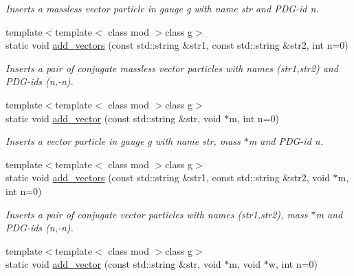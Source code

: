 \begin{DoxyCompactItemize}
\begin{DoxyCompactList}\small\item\em Inserts a massless vector particle in gauge g with name str and P\-D\-G-\/id n. \end{DoxyCompactList}\item 
\hypertarget{a00370_ad582726dbded0bc66c8f8bda99446b7d}{{\footnotesize template$<$template$<$ class mod $>$class g$>$ }\\static void \hyperlink{a00370_ad582726dbded0bc66c8f8bda99446b7d}{add\-\_\-vectors} (const std\-::string \&str1, const std\-::string \&str2, int n=0)}\label{a00370_ad582726dbded0bc66c8f8bda99446b7d}

\begin{DoxyCompactList}\small\item\em Inserts a pair of conjugate massless vector particles with names (str1,str2) and P\-D\-G-\/ids (n,-\/n). \end{DoxyCompactList}\item 
\hypertarget{a00370_ab03c093b9bd2cf4d67f646204bf2f7d0}{{\footnotesize template$<$template$<$ class mod $>$class g$>$ }\\static void \hyperlink{a00370_ab03c093b9bd2cf4d67f646204bf2f7d0}{add\-\_\-vector} (const std\-::string \&str, void $\ast$m, int n=0)}\label{a00370_ab03c093b9bd2cf4d67f646204bf2f7d0}

\begin{DoxyCompactList}\small\item\em Inserts a vector particle in gauge g with name str, mass $\ast$m and P\-D\-G-\/id n. \end{DoxyCompactList}\item 
\hypertarget{a00370_ab97bc2dcf6fa9351a4d615be5e7a8425}{{\footnotesize template$<$template$<$ class mod $>$class g$>$ }\\static void \hyperlink{a00370_ab97bc2dcf6fa9351a4d615be5e7a8425}{add\-\_\-vectors} (const std\-::string \&str1, const std\-::string \&str2, void $\ast$m, int n=0)}\label{a00370_ab97bc2dcf6fa9351a4d615be5e7a8425}

\begin{DoxyCompactList}\small\item\em Inserts a pair of conjugate vector particles with names (str1,str2), mass $\ast$m and P\-D\-G-\/ids (n,-\/n). \end{DoxyCompactList}\item 
\hypertarget{a00370_a8fb7f8b4ddb45dc1889b046a0f333a3b}{{\footnotesize template$<$template$<$ class mod $>$class g$>$ }\\static void \hyperlink{a00370_a8fb7f8b4ddb45dc1889b046a0f333a3b}{add\-\_\-vector} (const std\-::string \&str, void $\ast$m, void $\ast$w, int n=0)}\label{a00370_a8fb7f8b4ddb45dc1889b046a0f333a3b}


\end{DoxyCompactItemize}
